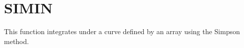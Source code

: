 \section{SIMIN}
\label{sect:simin}

\noindent This function integrates under a curve defined by an array using the
Simpson method.\\
